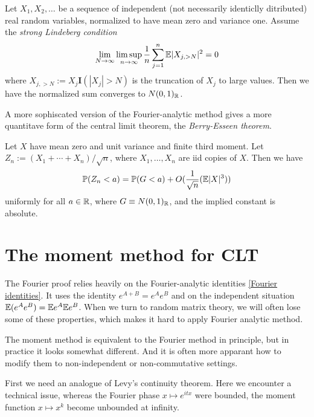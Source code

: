 \begin{theorem}
    \label{lindeberg central limit theorem}
    Let $X_1,X_2,\dots$ be a sequence of independent (not necessarily identiclly ditributed) real random variables, normalized to have mean zero and variance one. 
    Assume the \textit{strong Lindeberg condition} 
    \begin{equation*}
        \lim_{N\to \infty} \limsup_{n\to \infty} \frac{1}{n}\sum_{j=1}^n \mathbb{E} |X_{j,>N}|^2 =0
    \end{equation*}
    where $X_{j,>N} := X_j \mathbf I(|X_j|>N)$ is the truncation of $X_j$ to large values. Then we have the normalized sum converges to $N(0,1)_{\mathbb{R}}$. 
\end{theorem}


A more sophiscated version of the Fourier-analytic method gives a more quantitave form of the central limit theorem, the \textit{Berry-Esseen theorem}.
\begin{theorem}
    Let $X$ have mean zero and unit variance and finite third moment. Let $Z_n := (X_1+\cdots+X_n)/\sqrt{n}$, where $X_1,\dots,X_n$ are iid copies of $X$. Then we have 
    \begin{equation}\label{berry esseen theorem}
        \mathbb{P}(Z_n < a ) =\mathbb{P} (G< a) +O(\frac{1}{\sqrt{n}}(\mathbb{E} |X|^3))
    \end{equation}
    uniformly for all $a\in \mathbb{R}$, where $G \equiv N(0,1)_{\mathbb{R}} $, and the implied constant is absolute.
\end{theorem}

\section{The moment method for CLT}

The Fourier proof relies heavily on the Fourier-analytic identities \ref{Fourier identities}. It uses the identity $e^{A+B} = e^Ae^B$ and on the independent situation $\mathbb{E}(e^Ae^B)=\mathbb{E} e^A\mathbb{E} e^B$. 
When we turn to random matrix theory, we will often lose some of these properties, which makes it hard to apply Fourier analytic method. 

The moment method is equivalent to the Fourier method in principle, but in practice it looks somewhat different. And it is often more apparant how to modify them to non-independent or non-commutative settings. 

First we need an analogue of Levy's continuity theorem. 
Here we encounter a technical issue, whereas the Fourier phase $x\mapsto e^{itx}$ were bounded, the moment function $x\mapsto x^k$ become unbounded at infinity. 


